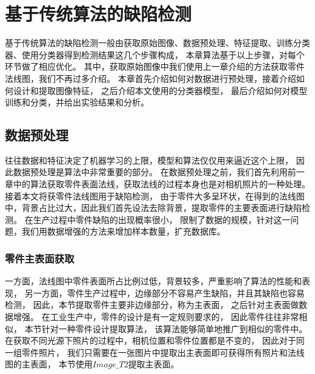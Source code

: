 \chapter{基于传统算法的缺陷检测}
\label{chapter:chuantongfangfa}

基于传统算法的缺陷检测一般由获取原始图像、数据预处理、特征提取、训练分类器、使用分类器得到检测结果这几个步骤构成，
本章算法基于以上步骤，对每个环节做了相应优化。
其中，获取原始图像中我们使用上一章介绍的方法获取零件法线图，我们不再过多介绍。
本章首先介绍如何对数据进行预处理，接着介绍如何设计和提取图像特征，
之后介绍本文使用的分类器模型，
最后介绍如何对模型训练和分类，并给出实验结果和分析。

\section{数据预处理}

往往数据和特征决定了机器学习的上限，模型和算法仅仅用来逼近这个上限，
因此数据预处理是算法中非常重要的部分。
在数据预处理之前，我们首先利用前一章中的算法获取零件表面法线，获取法线的过程本身也是对相机照片的一种处理。
接着本文将获零件法线图用于缺陷检测，
由于零件大多呈环状，在得到的法线图中，背景占比过大，因此我们首先设法去除背景，提取零件的主要表面进行缺陷检测。
在生产过程中零件缺陷的出现概率很小，
限制了数据的规模，针对这一问题，我们用数据增强的方法来增加样本数量，扩充数据库。

\subsection{零件主表面获取}

一方面，法线图中零件表面所占比例过低，背景较多，严重影响了算法的性能和表现，
另一方面，零件生产过程中，边缘部分不容易产生缺陷，并且其缺陷也容易检测，
因此，本节提取零件主要非边缘部分，称为主表面，
之后针对主表面做数据增强。
在工业生产中，零件的设计是有一定规则要求的，
因此零件往往非常相似，
本节针对一种零件设计提取算法，
该算法能够简单地推广到相似的零件中。
在获取不同光源下照片的过程中，相机位置和零件位置都是不变的，
因此对于同一组零件照片，
我们只需要在一张图片中提取出主表面即可获得所有照片和法线图的主表面，
本节使用$Image\_T 2$提取主表面。

